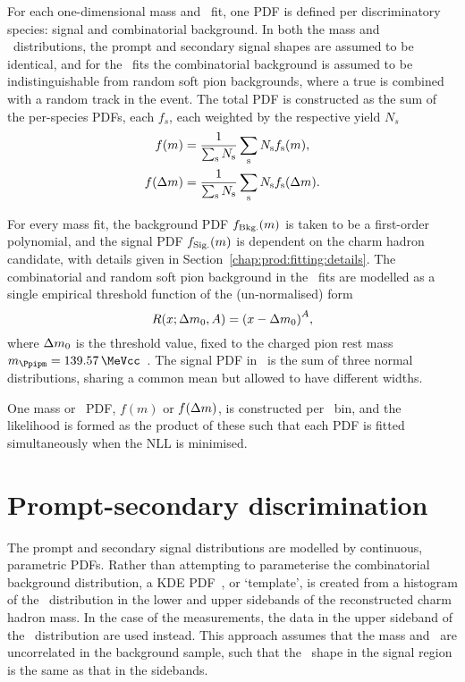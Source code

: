 For each one-dimensional mass and \deltam\ fit, one PDF is defined per 
discriminatory species: signal and combinatorial background.
In both the mass and \deltam\ distributions, the prompt and secondary signal 
shapes are assumed to be identical, and for the \deltam\ fits the combinatorial 
background is assumed to be indistinguishable from random soft pion 
backgrounds, where a true \PDzero is combined with a random track in the event.
The total \ac{PDF} is constructed as the sum of the per-species \acp{PDF}, each $f_{s}$, 
each weighted by the respective yield $N_{s}$
\begin{align}
  f(m) &= \frac{1}{\sum_{\textnormal{s}} N_{\textnormal{s}}}
          \sum_{\textnormal{s}} N_{\textnormal{s}}
          f_{\textnormal{s}}(m),\\
  f(\Delta{m}) &= \frac{1}{\sum_{\textnormal{s}} N_{\textnormal{s}}}
                \sum_{\textnormal{s}} N_{\textnormal{s}}
                f_{\textnormal{s}}(\Delta{m}).
\end{align}

For every mass fit, the background PDF $f_{\textnormal{Bkg.}}(m)$ is taken to 
be a first-order polynomial, and the signal PDF $f_{\textnormal{Sig.}}(m)$ is 
dependent on the charm hadron candidate, with details given in 
Section~\ref{chap:prod:fitting:details}.
The combinatorial and random soft pion background in the \deltam\ fits are 
modelled as a single empirical threshold function of the (un-normalised) form
\begin{equation}
  R(x; \Delta{m}_{0}, A) = {(x - \Delta{m}_{0})}^A,
\end{equation}
where $\Delta{m}_{0}$ is the threshold value, fixed to the charged pion rest mass 
$m_{\Ppipm} = \SI{139.57}{\MeVcc}$~\cite{PDG2014}.
The signal PDF in \deltam\ is the sum of three normal distributions, sharing a 
common mean but allowed to have different widths.

One mass or \deltam\ PDF, $f(m)$ or $f(\Delta{m})$, is constructed per \pTy\ bin, 
and the likelihood is formed as the product of these such that each PDF is 
fitted simultaneously when the \ac{NLL} is minimised.

\section{Prompt-secondary discrimination}
\label{chap:prod:fitting:ipchisq}

The prompt and secondary signal distributions are modelled by continuous, 
parametric \acp{PDF}.
Rather than attempting to parameterise the combinatorial background 
distribution, a \acf{KDE} \ac{PDF}~\cite{Poluektov:2014rxa}, or `template', is 
created from a histogram of the \lnipchisq\ distribution in the lower and upper 
sidebands of the reconstructed charm hadron mass.
In the case of the \PDstarp measurements, the data in the upper sideband of the 
\deltam\ distribution are used instead.
This approach assumes that the mass and \lnipchisq\ are uncorrelated in the 
background sample, such that the \lnipchisq\ shape in the signal region is the 
same as that in the sidebands.

